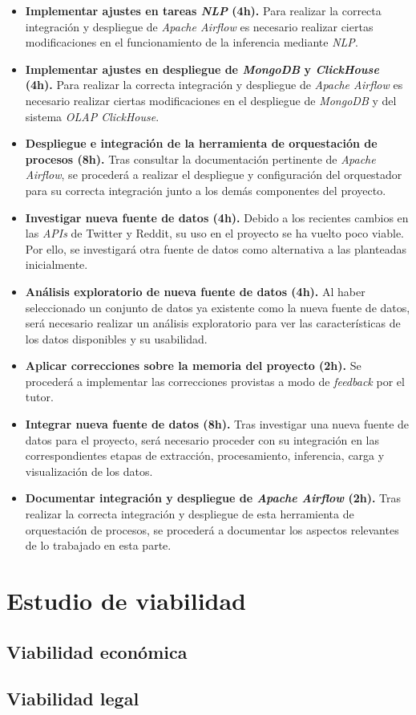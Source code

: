 \begin{itemize}
    \item \textbf{Implementar ajustes en tareas \textit{NLP} (4h).} Para realizar la correcta integración y despliegue de \textit{Apache Airflow} es necesario realizar ciertas modificaciones en el funcionamiento de la inferencia mediante \textit{NLP}.
    
    \item \textbf{Implementar ajustes en despliegue de \textit{MongoDB} y \textit{ClickHouse} (4h).} Para realizar la correcta integración y despliegue de \textit{Apache Airflow} es necesario realizar ciertas modificaciones en el despliegue de \textit{MongoDB} y del sistema \textit{OLAP ClickHouse}.
    
    \item \textbf{Despliegue e integración de la herramienta de orquestación de procesos (8h).} Tras consultar la documentación pertinente de \textit{Apache Airflow}, se procederá a realizar el despliegue y configuración del orquestador para su correcta integración junto a los demás componentes del proyecto.
    
    \item \textbf{Investigar nueva fuente de datos (4h).} Debido a los recientes cambios en las \textit{APIs} de Twitter y Reddit, su uso en el proyecto se ha vuelto poco viable. Por ello, se investigará otra fuente de datos como alternativa a las planteadas inicialmente.

    \item \textbf{Análisis exploratorio de nueva fuente de datos (4h).} Al haber seleccionado un conjunto de datos ya existente como la nueva fuente de datos, será necesario realizar un análisis exploratorio para ver las características de los datos disponibles y su usabilidad.

    \item \textbf{Aplicar correcciones sobre la memoria del proyecto (2h).} Se procederá a implementar las correcciones provistas a modo de \textit{feedback} por el tutor.

    \item \textbf{Integrar nueva fuente de datos (8h).} Tras investigar una nueva fuente de datos para el proyecto, será necesario proceder con su integración en las correspondientes etapas de extracción, procesamiento, inferencia, carga y visualización de los datos.

    \item \textbf{Documentar integración y despliegue de \textit{Apache Airflow} (2h).} Tras realizar la correcta integración y despliegue de esta herramienta de orquestación de procesos, se procederá a documentar los aspectos relevantes de lo trabajado en esta parte.

\end{itemize}


\section{Estudio de viabilidad}

\subsection{Viabilidad económica}

\subsection{Viabilidad legal}


